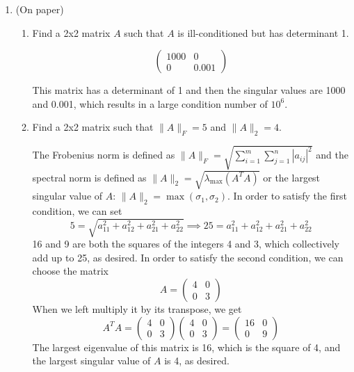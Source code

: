\documentclass[12pt]{article}
\begin{document}
\begin{enumerate}
    \item (On paper)
    \begin{enumerate}
        \item Find a 2x2 matrix \(A\) such that \(A\) is ill-conditioned but has determinant 1.
        
        \begin{equation}
            \begin{pmatrix}
                1000 & 0 \\
                0 & 0.001
            \end{pmatrix}
        \end{equation}

        This matrix has a determinant of 1 and then the singular values are 1000 and 0.001, which results in a large condition number of \(10^6\).
        
        \item Find a 2x2 matrix such that \(\|A\|_F = 5\) and \(\|A\|_2 = 4\).
        
        The Frobenius norm is defined as \(\|A\|_F = \sqrt{\sum_{i=1}^{m} \sum_{j=1}^{n} |a_{ij}|^2}\) and the spectral norm is defined as \(\|A\|_2 = \sqrt{\lambda_{\text{max}}(A^TA)}\) or the largest singular value of \(A\): \(\|A\|_2 = \max(\sigma_1, \sigma_2)\). In order to satisfy the first condition, we can set 
\begin{equation}
    5 = \sqrt{a_{11}^2 + a_{12}^2 + a_{21}^2 + a_{22}^2} \implies 25 = a_{11}^2 + a_{12}^2 + a_{21}^2 + a_{22}^2
\end{equation}
16 and 9 are both the squares of the integers 4 and 3, which collectively add up to 25, as desired. In order to satisfy the second condition, we can choose the matrix
\begin{equation}
    A=\begin{pmatrix}
        4 & 0 \\
        0 & 3
\end{pmatrix}
\end{equation}
When we left multiply it by its transpose, we get
\begin{equation}
    A^TA = \begin{pmatrix}
        4 & 0 \\
        0 & 3
    \end{pmatrix} \begin{pmatrix}
        4 & 0 \\
        0 & 3
    \end{pmatrix} = \begin{pmatrix}
        16 & 0 \\
        0 & 9
    \end{pmatrix}
\end{equation}
The largest eigenvalue of this matrix is 16, which is the square of 4, and the largest singular value of \(A\) is 4, as desired.
        

\end{enumerate}
\end{enumerate}
\end{document}
